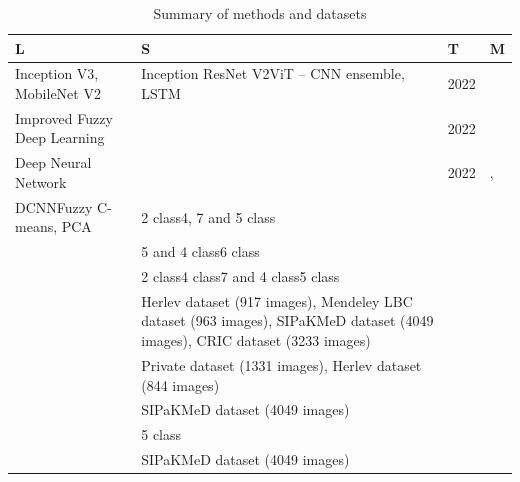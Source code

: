 \documentclass[final,5p,times,twocolumn,authoryear]{elsarticle}
\begin{document}
\begin{table}
\centering
\caption{Summary of methods and datasets}
\label{tab:summary}
\begin{tabular}{llll}
\hline
L & S & T & M \\
\hline
Inception V3, MobileNet V2 & Inception ResNet V2ViT – CNN ensemble, LSTM & 2022 & \cite{ref60} \\
Improved Fuzzy Deep Learning & & 2022 & \cite{ref61} \\
Deep Neural Network & & 2022 & \cite{ref62}, \cite{ref63} \\
DCNNFuzzy C-means, PCA & 2 class4, 7 and 5 class & & \\
 & 5 and 4 class6 class & & \\
 & 2 class4 class7 and 4 class5 class & & \\
 & Herlev dataset (917 images), Mendeley LBC dataset (963 images), SIPaKMeD dataset (4049 images), CRIC dataset (3233 images) & & \\
 & Private dataset (1331 images), Herlev dataset (844 images) & & \\
 & SIPaKMeD dataset (4049 images) & & \\
 & 5 class & & \\
 & SIPaKMeD dataset (4049 images) & & \\
\hline
\end{tabular}
\end{table}
\end{document}
